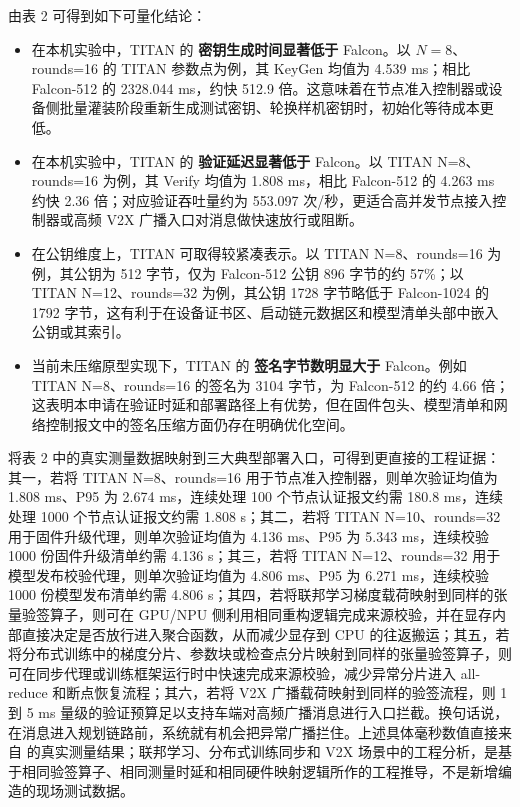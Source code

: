 \documentclass[12pt,a4paper]{article}
\begin{document}
由表 2 可得到如下可量化结论：
\begin{itemize}
    \item 在本机实验中，TITAN 的 \textbf{密钥生成时间显著低于} Falcon。以 $N=8$、rounds=16 的 TITAN 参数点为例，其 KeyGen 均值为 4.539 ms；相比 Falcon-512 的 2328.044 ms，约快 512.9 倍。这意味着在节点准入控制器或设备侧批量灌装阶段重新生成测试密钥、轮换样机密钥时，初始化等待成本更低。
    \item 在本机实验中，TITAN 的 \textbf{验证延迟显著低于} Falcon。以 TITAN N=8、rounds=16 为例，其 Verify 均值为 1.808 ms，相比 Falcon-512 的 4.263 ms 约快 2.36 倍；对应验证吞吐量约为 553.097 次/秒，更适合高并发节点接入控制器或高频 V2X 广播入口对消息做快速放行或阻断。
    \item 在公钥维度上，TITAN 可取得较紧凑表示。以 TITAN N=8、rounds=16 为例，其公钥为 512 字节，仅为 Falcon-512 公钥 896 字节的约 57\%；以 TITAN N=12、rounds=32 为例，其公钥 1728 字节略低于 Falcon-1024 的 1792 字节，这有利于在设备证书区、启动链元数据区和模型清单头部中嵌入公钥或其索引。
    \item 当前未压缩原型实现下，TITAN 的 \textbf{签名字节数明显大于} Falcon。例如 TITAN N=8、rounds=16 的签名为 3104 字节，为 Falcon-512 的约 4.66 倍；这表明本申请在验证时延和部署路径上有优势，但在固件包头、模型清单和网络控制报文中的签名压缩方面仍存在明确优化空间。
\end{itemize}

将表 2 中的真实测量数据映射到三大典型部署入口，可得到更直接的工程证据：其一，若将 TITAN N=8、rounds=16 用于节点准入控制器，则单次验证均值为 1.808 ms、P95 为 2.674 ms，连续处理 100 个节点认证报文约需 180.8 ms，连续处理 1000 个节点认证报文约需 1.808 s；其二，若将 TITAN N=10、rounds=32 用于固件升级代理，则单次验证均值为 4.136 ms、P95 为 5.343 ms，连续校验 1000 份固件升级清单约需 4.136 s；其三，若将 TITAN N=12、rounds=32 用于模型发布校验代理，则单次验证均值为 4.806 ms、P95 为 6.271 ms，连续校验 1000 份模型发布清单约需 4.806 s；其四，若将联邦学习梯度载荷映射到同样的张量验签算子，则可在 GPU/NPU 侧利用相同重构逻辑完成来源校验，并在显存内部直接决定是否放行进入聚合函数，从而减少显存到 CPU 的往返搬运；其五，若将分布式训练中的梯度分片、参数块或检查点分片映射到同样的张量验签算子，则可在同步代理或训练框架运行时中快速完成来源校验，减少异常分片进入 all-reduce 和断点恢复流程；其六，若将 V2X 广播载荷映射到同样的验签流程，则 1 到 5 ms 量级的验证预算足以支持车端对高频广播消息进行入口拦截。换句话说，在消息进入规划链路前，系统就有机会把异常广播拦住。上述具体毫秒数值直接来自  的真实测量结果；联邦学习、分布式训练同步和 V2X 场景中的工程分析，是基于相同验签算子、相同测量时延和相同硬件映射逻辑所作的工程推导，不是新增编造的现场测试数据。
\end{document}
